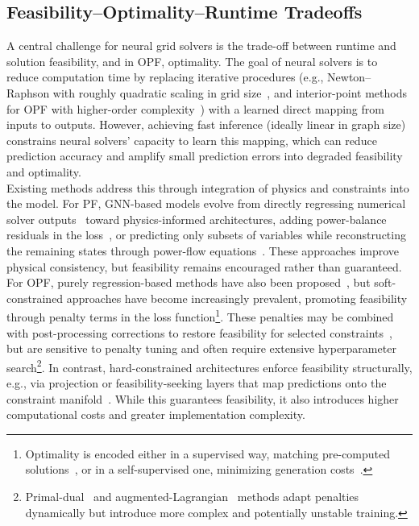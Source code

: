 \subsection{Feasibility--Optimality--Runtime Tradeoffs}

A central challenge for neural grid solvers is the trade-off between runtime and solution feasibility, and in OPF, optimality. The goal of neural solvers is to reduce computation time by replacing iterative procedures (e.g., Newton–Raphson with roughly quadratic scaling in grid size~\cite{4596138}, and interior-point methods for OPF with higher-order complexity~\cite{cubic}) with a learned direct mapping from inputs to outputs. However, achieving fast inference (ideally linear in graph size) constrains neural solvers' capacity to learn this mapping, which can reduce prediction accuracy and amplify small prediction errors into degraded feasibility and optimality. \\

Existing methods address this through integration of physics and constraints into the model. For PF, GNN-based models evolve from directly regressing numerical solver outputs~\cite{lin2024powerflownet} toward physics-informed architectures, adding power-balance residuals in the loss~\cite{LOPEZGARCIA2023105567}, or predicting only subsets of variables while reconstructing the remaining states through power-flow equations~\cite{DONON2020106547}. These approaches improve physical consistency, but feasibility remains encouraged rather than guaranteed. For OPF, purely regression-based methods have also been proposed~\cite{arowolo2025}, but soft-constrained approaches have become increasingly prevalent, promoting feasibility through penalty terms in the loss function\footnote{Optimality is encoded either in a supervised way, matching pre-computed solutions~\cite{piloto2024}, or in a self-supervised one, minimizing generation costs~\cite{dc3}.}. These penalties may be combined with post-processing corrections to restore feasibility for selected constraints~\cite{piloto2024}, but are sensitive to penalty tuning and often require extensive hyperparameter search\footnote{Primal-dual~\cite{primaldual} and augmented-Lagrangian~\cite{lumina2026} methods adapt penalties dynamically but introduce more complex and potentially unstable training.}. In contrast, hard-constrained architectures enforce feasibility structurally, e.g., via projection or feasibility-seeking layers that map predictions onto the constraint manifold~\cite{NEURIPS2025_3874e2be}. While this guarantees feasibility, it also introduces higher computational costs and greater implementation complexity.\\

